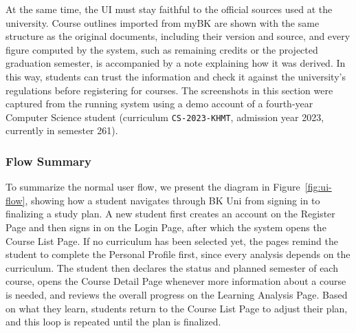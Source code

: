At the same time, the UI must stay faithful to the official sources used at the university. Course outlines imported from myBK are shown with the same structure as the original documents, including their version and source, and every figure computed by the system, such as remaining credits or the projected graduation semester, is accompanied by a note explaining how it was derived. In this way, students can trust the information and check it against the university's regulations before registering for courses. The screenshots in this section were captured from the running system using a demo account of a fourth-year Computer Science student (curriculum \texttt{CS-2023-KHMT}, admission year 2023, currently in semester 261).

\subsubsection{Flow Summary}
\label{subsubsec:ui-flow}

To summarize the normal user flow, we present the diagram in Figure~\ref{fig:ui-flow}, showing how a student navigates through BK Uni from signing in to finalizing a study plan. A new student first creates an account on the Register Page and then signs in on the Login Page, after which the system opens the Course List Page. If no curriculum has been selected yet, the pages remind the student to complete the Personal Profile first, since every analysis depends on the curriculum. The student then declares the status and planned semester of each course, opens the Course Detail Page whenever more information about a course is needed, and reviews the overall progress on the Learning Analysis Page. Based on what they learn, students return to the Course List Page to adjust their plan, and this loop is repeated until the plan is finalized.

